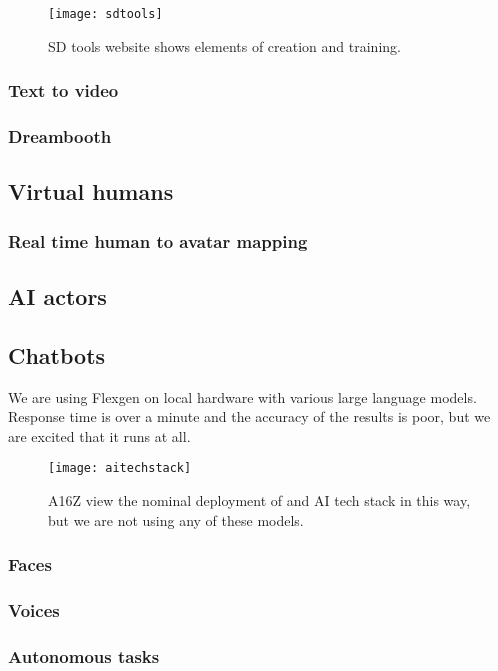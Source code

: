 \begin{figure}
  \centering
    \texttt{[image: sdtools]}
  \caption{SD tools website shows elements of creation and training.}
  	\label{fig:SDTools}
\end{figure}
\subsubsection{Text to video}
\subsubsection{Dreambooth}


\subsection{Virtual humans}
\subsubsection{Real time human to avatar mapping}
\subsection{AI actors}
\subsection{Chatbots}
We are using Flexgen \cite{Sheng2023} on local hardware with various large language models. Response time is over a minute and the accuracy of the results is poor, but we are excited that it runs at all.

\begin{figure}
  \centering
    \texttt{[image: aitechstack]}
  \caption{A16Z view the nominal deployment of and AI tech stack in this way, but we are not using any of these models.}
  	\label{fig:aitechstack}
\end{figure}


\subsubsection{Faces}
\subsubsection{Voices}
\subsubsection{Autonomous tasks}

